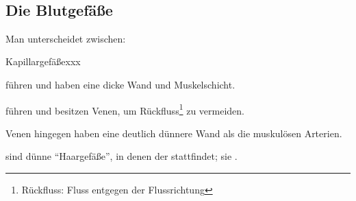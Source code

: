 \begin{gWideParEnv}
{


}
\end{gWideParEnv}

~




\subsection{Die Blutgefäße}

Man unterscheidet zwischen:

\begin{labeling}[\dots{}]{Kapillargefäßexxx}
    \item[\T{Arterien}] führen  und haben eine dicke
    Wand und Muskelschicht. 
    \item[\T{Venen}] führen  und
    besitzen Venen, um Rückfluss\footnote{Rückfluss:
    Fluss entgegen der Flussrichtung} zu vermeiden. 
    
    Venen
hingegen haben eine deutlich dünnere Wand als die
muskulösen Arterien.     
    \item[\T{Kapillargefäße}] sind dünne "`Haargefäße"',
    in denen der  stattfindet; sie . 
\end{labeling}


